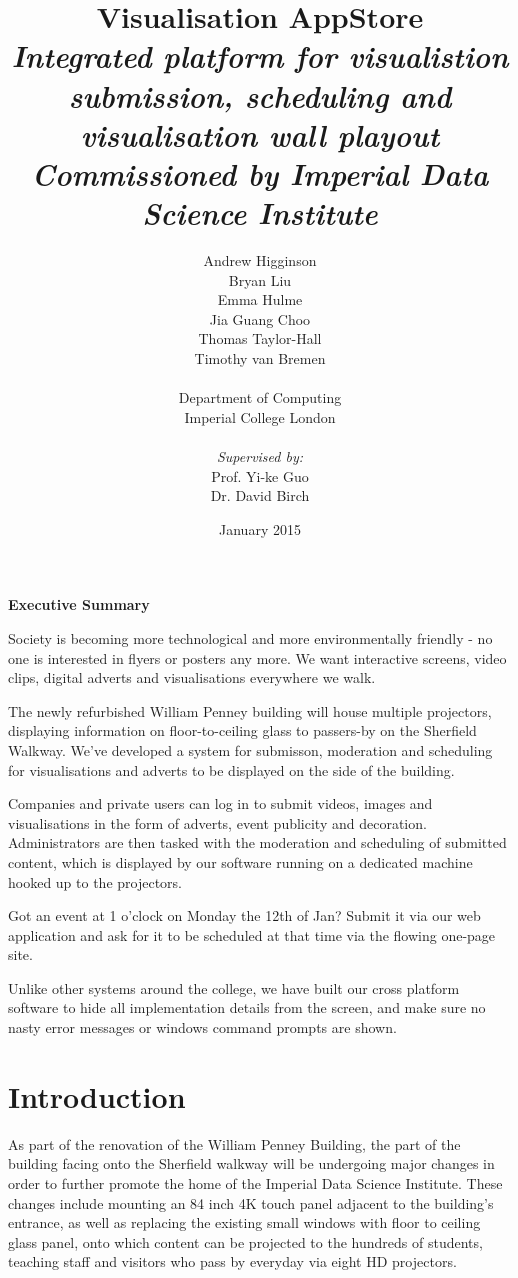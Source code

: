 \documentclass[a4paper, titlepage]{article}
\title{Visualisation AppStore \\ \vspace{10pt}
\textit{\large Integrated platform for visualistion submission, scheduling and visualisation wall playout} \\ \vspace*{-5pt}
\textit{\large Commissioned by Imperial Data Science Institute}}
\author{Andrew Higginson\\ Bryan Liu \\ Emma Hulme \\ Jia Guang Choo \\
        Thomas Taylor-Hall \\ Timothy van Bremen \\\\ 
        Department of Computing \\ Imperial College London \\\\ \textit{Supervised by:} \\
        Prof. Yi-ke Guo \\ Dr. David Birch}
\date{January 2015}
\begin{document}
\maketitle


\newpage
{}
\Large
\textbf{Executive Summary}

\normalsize

Society is becoming more technological and more environmentally friendly - no one is interested in 
flyers or posters any more. We want interactive screens, video clips, digital adverts and 
visualisations everywhere we walk.

The newly refurbished William Penney building will house multiple projectors, displaying information
on floor-to-ceiling glass to passers-by on the Sherfield Walkway. We've developed a system for 
submisson, moderation and scheduling for visualisations and adverts to be displayed on the side of 
the building. 

Companies and private users can log in to submit videos, images and visualisations in the form of 
adverts, event publicity and decoration. Administrators are then tasked with the moderation and 
scheduling of submitted content, which is displayed by our software running on a dedicated machine
hooked up to the projectors. 

Got an event at 1 o'clock on Monday the 12th of Jan? Submit it via our web application and ask for 
it to be scheduled at that time via the flowing one-page site. 

Unlike other systems around the college, we have built our cross platform software to hide all 
implementation details from the screen, and make sure no nasty error messages or windows command 
prompts are shown.





\newpage
\tableofcontents
\listoffigures
\listoftables


\newpage
{}
\section{Introduction}

As part of the renovation of the William Penney Building, the part of the building facing onto the Sherfield walkway will be undergoing major changes in order to further promote the home of the Imperial Data Science Institute. These changes include mounting an 84 inch 4K touch panel adjacent to the building's entrance, as well as replacing the existing small windows with floor to ceiling glass panel, onto which content can be projected to the hundreds of students, teaching staff and visitors who pass by everyday via eight HD projectors.
\end{document}
